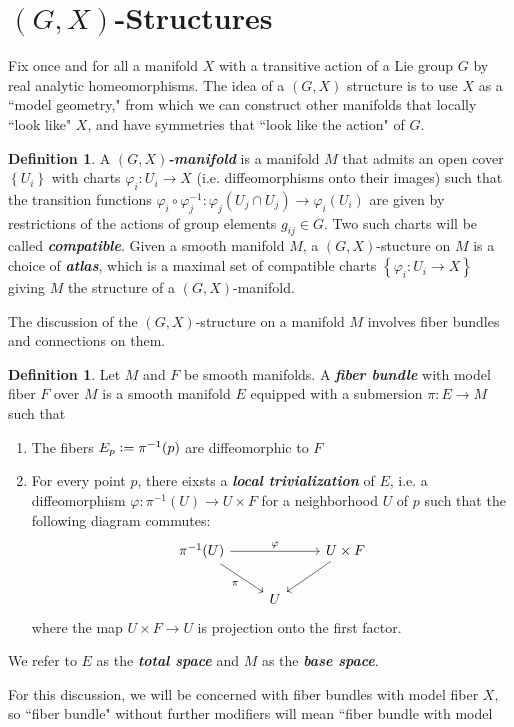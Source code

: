 \documentclass[psamsfonts, 12pt]{amsart}
\theoremstyle{definition}
\newtheorem{defn}[thm]{Definition}
\theoremstyle{remark}
\newcommand{\ib}[1]{\textbf{\textit{#1}}}
\newcommand{\inv}{^{-1}}
\newcommand{\set}[1]{\left\lbrace #1 \right\rbrace}
\newcommand{\defeq}{\vcentcolon=}
\begin{document}
\section{$(G,X)$-Structures}
%
Fix once and for all a manifold $X$ with a transitive action of a Lie group $G$
by real analytic homeomorphisms. The idea of a $(G,X)$ structure is to use $X$
as a ``model geometry," from which we can construct other manifolds that locally
``look like" $X$, and have symmetries that ``look like the action" of $G$.
%
\begin{defn}
A \ib{$(G,X)$-manifold} is a manifold $M$ that admits an open cover
$\set{U_i}$ with charts $\varphi_i : U_i \to X$ (i.e. diffeomorphisms onto their images)
such that the transition functions
$\varphi_i \circ \varphi_j\inv : \varphi_j(U_j \cap U_j) \to \varphi_i(U_i)$
are given by restrictions of the actions of group elements $g_{ij} \in G$. Two such
charts will be called \ib{compatible}. Given a smooth manifold $M$, a $(G,X)$-stucture
on $M$ is a choice of \ib{atlas}, which is a maximal set of compatible charts
$\set{\varphi_i : U_i \to X}$ giving $M$ the structure of a $(G,X)$-manifold.
\end{defn}
%
The discussion of the $(G,X)$-structure on a manifold $M$ involves fiber bundles
and connections on them.
%
\begin{defn}
Let $M$ and $F$ be smooth manifolds. A \ib{fiber bundle} with model fiber $F$ over
$M$ is a smooth manifold $E$ equipped with a submersion $\pi : E \to M$ such that
\begin{enumerate}
  \item The fibers $E_p \defeq \pi\inv(p)$ are diffeomorphic to $F$
  \item For every point $p$, there eixsts a \ib{local trivialization} of $E$,
  i.e. a diffeomorphism $\varphi : \pi\inv(U) \to U \times F$ for a neighborhood
  $U$ of $p$ such that the following diagram commutes:
  \[\begin{tikzcd}
  \pi\inv(U) \ar[rr,"\varphi"] \ar[dr, "\pi"']&& U \times F \ar[dl] \\
  & U
  \end{tikzcd}\]
  where the map $U \times F \to U$ is projection onto the first factor.
\end{enumerate}
We refer to $E$ as the \ib{total space} and $M$ as the \ib{base space}.
\end{defn}
%
For this discussion, we will be concerned with fiber bundles with model fiber $X$,
so ``fiber bundle" without further modifiers will mean ``fiber bundle with model
\end{document}
